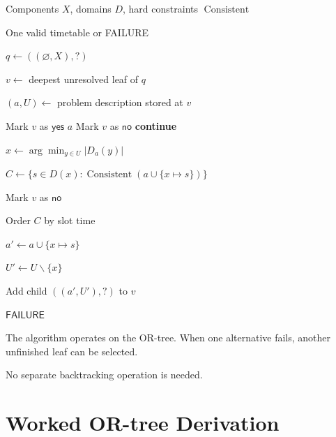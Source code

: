 \documentclass[11pt,letterpaper]{article}
\newcommand{\setminusop}{\mathbin{\backslash}}
\newcommand{\yes}{\mathsf{yes}}
\newcommand{\no}{\mathsf{no}}
\newcommand{\ask}{\mathord{?}}
\newcommand{\Const}{\operatorname{Const}}
\newcommand{\Consistent}{\operatorname{Consistent}}
\begin{document}
\begin{idea}
\begin{algorithmic}[1]

\Require Components $X$, domains $D$,
hard constraints $\Consistent$

\Ensure One valid timetable or FAILURE

\State $q\gets((\varnothing,X),\ask)$


    \State $v\gets$ deepest unresolved leaf of $q$

    \State $(a,U)\gets$
    problem description stored at $v$

        \If{$\Const(a)=\mathsf{true}$}
            \State Mark $v$ as $\yes$
            \State \Return $a$
        \Else
            \State Mark $v$ as $\no$
            \State \textbf{continue}
        \EndIf
    \EndIf

    \State $x\gets
    \arg\min_{y\in U}|D_a(y)|$

    \State $C\gets
    \{s\in D(x):
    \Consistent(a\cup\{x\mapsto s\})\}$


        \State Mark $v$ as $\no$

    \Else

        \State Order $C$ by slot time


            \State $a'\gets
            a\cup\{x\mapsto s\}$

            \State $U'\gets
            U\setminusop\{x\}$

            \State Add child
            $((a',U'),\ask)$ to $v$

        \EndFor

    \EndIf

\EndWhile

\State \Return $\mathsf{FAILURE}$

\end{algorithmic}
\end{idea}

The algorithm operates on the OR-tree.
When one alternative fails, another
unfinished leaf can be selected.

No separate backtracking operation
is needed.

\section{Worked OR-tree Derivation}
\end{document}
